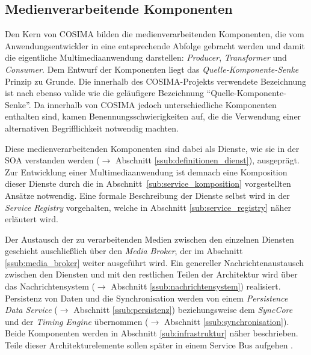 
\subsection{Medienverarbeitende Komponenten} %
\label{sub:medienverarbeitende_komponenten}

  Den Kern von COSIMA bilden die medienverarbeitenden Komponenten, die vom Anwendungsentwickler in eine entsprechende Abfolge gebracht werden und damit die eigentliche Multimediaanwendung darstellen: \emph{Producer}, \emph{Transformer} und \emph{Consumer}. Dem Entwurf der Komponenten liegt das \emph{Quelle-Komponente-Senke} Prinzip zu Grunde. Die innerhalb des COSIMA-Projekts verwendete Bezeichnung ist nach \citep{a_multimedia_component_kit,multimedia_component_frameworks} ebenso valide wie die geläufigere Bezeichnung "`Quelle-Komponente-Senke"'. Da innerhalb von COSIMA jedoch unterschiedliche Komponenten enthalten sind, kamen Benennungsschwierigkeiten auf, die die Verwendung einer alternativen Begrifflichkeit notwendig machten.
  
  Diese medienverarbeitenden Komponenten sind dabei als Dienste, wie sie in der SOA verstanden werden ($\to$ Abschnitt \ref{ssub:definitionen_dienst}), ausgeprägt. Zur Entwicklung einer Multimediaanwendung ist demnach eine Komposition dieser Dienste durch die in Abschnitt~\ref{sub:service_komposition} vorgestellten Ansätze notwendig. Eine formale Beschreibung der Dienste selbst wird in der \emph{Service Registry} vorgehalten, welche in Abschnitt \ref{sub:service_registry} näher erläutert wird.
  
  Der Austausch der zu verarbeitenden Medien zwischen den einzelnen Diensten geschieht auschließlich über den \emph{Media Broker}, der im Abschnitt \ref{ssub:media_broker} weiter ausgeführt wird. Ein genereller Nachrichtenaustausch zwischen den Diensten und mit den restlichen Teilen der Architektur wird über das Nachrichtensystem ($\to$ Abschnitt \ref{ssub:nachrichtensystem}) realisiert. Persistenz von Daten und die Synchronisation werden von einem \emph{Persistence Data Service} ($\to$ Abschnitt \ref{ssub:persistenz}) beziehungsweise dem \emph{SyncCore} und der \emph{Timing Engine} übernommen ($\to$ Abschnitt \ref{ssub:synchronisation}). Beide Komponenten werden in Abschnitt \ref{sub:infrastruktur} näher beschrieben. Teile dieser Architekturelemente sollen später in einem Service Bus aufgehen \citep[S. 18]{bericht}.


